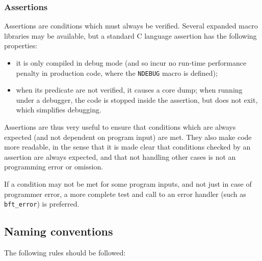 \subsubsection{Assertions}

Assertions are conditions which must always be verified. Several
expanded macro libraries may be available, but a standard C language
assertion has the following properties:

\begin{itemize}

\item it is only compiled in debug mode (and so incur no run-time
  performance penalty in production code, where the \texttt{NDEBUG}
  macro is defined);

\item when its predicate are not verified, it causes a core dump;
  when running under a debugger, the code is stopped inside the
  assertion, but does not exit, which simplifies debugging.

\end{itemize}

Assertions are thus very useful to ensure that conditions
which are always expected (and not dependent on program input)
are met. They also make code more readable, in the sense that
it is made clear that conditions checked by an assertion
are always expected, and that not handling other cases is not an
programming error or omission.

If a condition may not be met for some program inputs,
and not just in case of programmer error, a more complete
test and call to an error handler (such as \texttt{bft\_error})
is preferred.

\subsection{Naming conventions}

The following rules should be followed:

